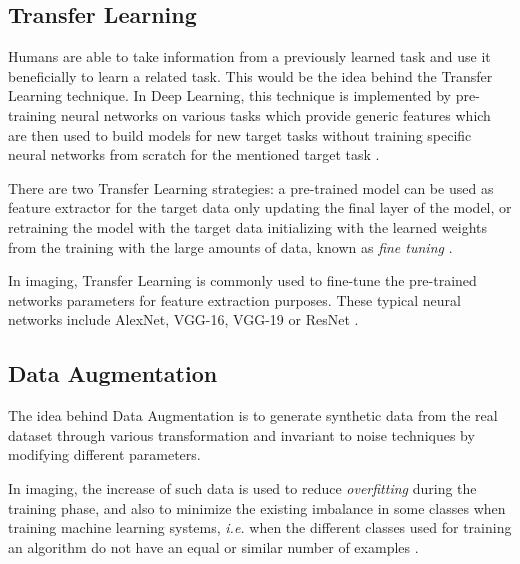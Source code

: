 \subsection{Transfer Learning}
\label{sec:trasnferLearning}
Humans are able to take information from a previously learned task and use it beneficially to learn a related task. This would be the idea behind the Transfer Learning technique. In  Deep Learning, this technique is implemented by pre-training neural networks on various tasks which provide generic features which are then used to build models for new target tasks without training specific neural networks from scratch for the mentioned target task \cite{pau2020}.

There are two Transfer Learning strategies: a pre-trained model can be used as feature extractor for the target data only updating the final layer of the model, or retraining the model with the target data initializing with the learned weights from the training with the large amounts of data, known as \emph{fine tuning} \cite{sinno2010transfer}.

In imaging, Transfer Learning is commonly used to fine-tune the pre-trained networks parameters for feature extraction purposes. These typical neural networks include AlexNet, VGG-16, VGG-19 or ResNet \cite{shaha2018transfer}.


\subsection{Data Augmentation}
\label{sec:dataAugmentation}
The idea behind Data Augmentation is to generate synthetic data from the real dataset through various transformation and invariant to noise techniques by modifying different parameters.

In imaging, the increase of such data is used to reduce \emph{overfitting} during the training phase, and also to minimize the existing imbalance in some classes when training machine learning systems, \emph{i.e.} when the different classes used for training an algorithm do not have an equal or similar number of examples \cite{shijie2017dataaugm}. 

